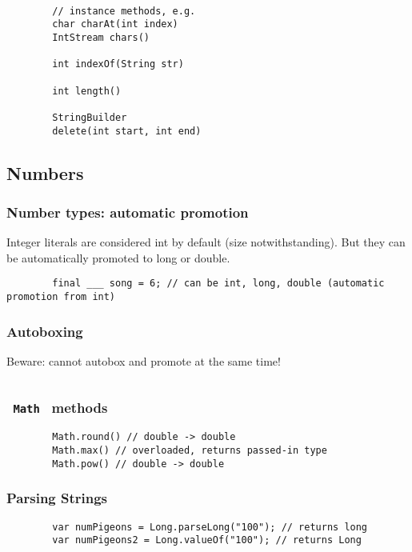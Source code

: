\documentclass{scrartcl}
\begin{document}
    \begin{lstlisting}

        // instance methods, e.g.
        char charAt(int index)
        IntStream chars()

        int indexOf(String str)

        int length()

        StringBuilder
        delete(int start, int end)
    \end{lstlisting}

\subsection{Numbers}
\subsubsection{Number types: automatic promotion}

    Integer literals are considered int by default (size notwithstanding). But they can be automatically promoted to long or double.

    \begin{lstlisting}
        final ___ song = 6; // can be int, long, double (automatic promotion from int)
    \end{lstlisting}

\subsubsection{Autoboxing}

    Beware: cannot autobox and promote at the same time!

    \begin{lstlisting}

    \end{lstlisting}


\subsubsection{\lstinline$ Math $ methods}
    \begin{lstlisting}
        Math.round() // double -> double
        Math.max() // overloaded, returns passed-in type
        Math.pow() // double -> double
    \end{lstlisting}

\subsubsection{Parsing Strings}
    \begin{lstlisting}
        var numPigeons = Long.parseLong("100"); // returns long
        var numPigeons2 = Long.valueOf("100"); // returns Long
    \end{lstlisting}
\end{document}

